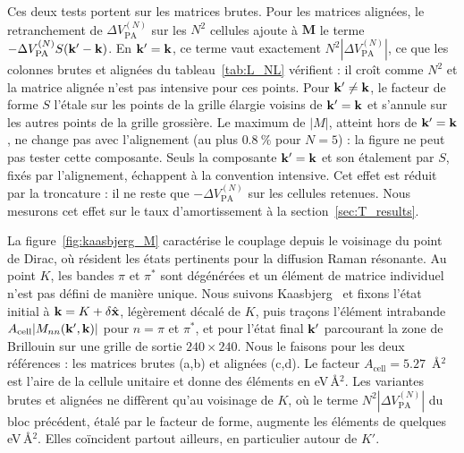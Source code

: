 Ces deux tests portent sur les matrices brutes. Pour les matrices alignées, le retranchement de $\Delta V_\text{PA}^{(N)}$ sur les $N^2$ cellules ajoute à $\bm M$ le terme $-\Delta V_\text{PA}^{(N)}S(\mathbf{k}'-\mathbf{k})$. En $\mathbf{k}'=\mathbf{k}$, ce terme vaut exactement $N^2|\Delta V_\text{PA}^{(N)}|$, ce que les colonnes brutes et alignées du tableau~\ref{tab:L_NL} vérifient : il croît comme $N^2$ et la matrice alignée n'est pas intensive pour ces points. Pour $\mathbf{k}'\neq \mathbf{k}$, le facteur de forme $S$ l'étale sur les points de la grille élargie voisins de $\mathbf{k}'=\mathbf{k}$ et s'annule sur les autres points de la grille grossière. Le maximum de $|M|$, atteint hors de $\mathbf{k}'=\mathbf{k}$, ne change pas avec l'alignement (au plus $0.8~\%$ pour $N=5$) : la figure ne peut pas tester cette composante. Seuls la composante $\mathbf{k}'=\mathbf{k}$ et son étalement par $S$, fixés par l'alignement, échappent à la convention intensive. Cet effet est réduit par la troncature : il ne reste que $-\Delta V_\text{PA}^{(N)}$ sur les cellules retenues. Nous mesurons cet effet sur le taux d'amortissement à la section~\ref{sec:T_results}.

\newpage
{}

La figure~\ref{fig:kaasbjerg_M} caractérise le couplage depuis le voisinage du point de Dirac, où résident les états pertinents pour la diffusion Raman résonante. Au point $K$, les bandes $\pi$ et $\pi^*$ sont dégénérées et un élément de matrice individuel n'est pas défini de manière unique. Nous suivons Kaasbjerg~\cite{kaasbjergAtomisticMatrixTheory2020} et fixons l'état initial à $\mathbf{k}=K+\delta\hat{\mathbf{x}}$, légèrement décalé de $K$, puis traçons l'élément intrabande $A_\text{cell}|M_{nn}(\mathbf{k}',\mathbf{k})|$ pour $n=\pi$ et $\pi^*$, et pour l'état final $\mathbf{k}'$ parcourant la zone de Brillouin sur une grille de sortie $240\times 240$. Nous le faisons pour les deux références : les matrices brutes (a,b) et alignées (c,d). Le facteur $A_\text{cell}=5.27$~\AA$^2$ est l'aire de la cellule unitaire et donne des éléments en eV\,\AA$^{2}$. Les variantes brutes et alignées ne diffèrent qu'au voisinage de $K$, où le terme $N^2|\Delta V_\text{PA}^{(N)}|$ du bloc précédent, étalé par le facteur de forme, augmente les éléments de quelques eV\,\AA$^2$. Elles coïncident partout ailleurs, en particulier autour de $K'$.


